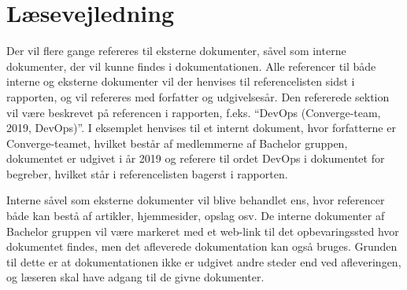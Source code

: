 \chapter{Læsevejledning}

Der vil flere gange refereres til eksterne dokumenter, såvel som interne dokumenter, der vil kunne findes i dokumentationen. Alle referencer til både interne og eksterne dokumenter vil der henvises til referencelisten sidst i rapporten, og vil refereres med forfatter og udgivelsesår. Den refererede sektion vil være beskrevet på referencen i rapporten, f.eks. “DevOps (Converge-team, 2019, DevOps)”. I eksemplet henvises til et internt dokument, hvor forfatterne er Converge-teamet, hvilket består af medlemmerne af Bachelor gruppen, dokumentet er udgivet i år 2019 og referere til ordet DevOps \cite[DevOps]{converge-terms} i dokumentet for begreber, hvilket står i referencelisten bagerst i rapporten.

Interne såvel som eksterne dokumenter vil blive behandlet ens, hvor referencer både kan bestå af artikler, hjemmesider, opslag osv. De interne dokumenter af Bachelor gruppen vil være markeret med et web-link til det opbevaringssted hvor dokumentet findes, men det afleverede dokumentation kan også bruges. Grunden til dette er at dokumentationen ikke er udgivet andre steder end ved afleveringen, og læseren skal have adgang til de givne dokumenter.


